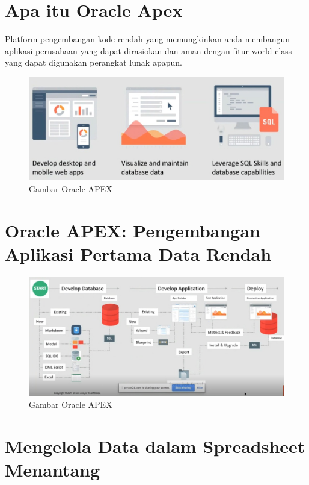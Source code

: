 \documentclass[12pt, times new roman, a4paper]{article}
\begin{document}
\section{Apa itu Oracle Apex}

Platform pengembangan kode rendah yang memungkinkan anda membangun
aplikasi perusahaan yang dapat dirasiokan dan aman dengan ﬁtur world-class yang dapat digunakan perangkat lunak apapun.\\

\begin{figure}[h]
	\centering
		\includegraphics[scale=0.3]{Gambar/2}
	\caption{Gambar Oracle APEX}
\end{figure}

\section{Oracle APEX: Pengembangan Aplikasi Pertama Data Rendah}

\begin{figure}[h]
	\centering
		\includegraphics[scale=0.3]{Gambar/1}
	\caption{Gambar Oracle APEX}
\end{figure}

\section{Mengelola Data dalam Spreadsheet Menantang}
\end{document}
